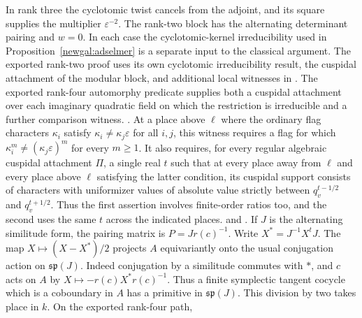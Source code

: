 In rank three the cyclotomic twist cancels from the adjoint, and its
square supplies the multiplier $\varepsilon^{-2}$. The rank-two block
has the alternating determinant pairing and $w=0$. In each case the
cyclotomic-kernel irreducibility used in Proposition~\ref{newgal:adselmer}
is a separate input to the classical argument. The exported rank-two
proof uses its own cyclotomic irreducibility result, the cuspidal
attachment of the modular block, and additional local witnesses in
.
The exported rank-four automorphy predicate supplies both a cuspidal
attachment over each imaginary quadratic field on which the restriction
is irreducible and a further comparison witness.
.
At a place above \(\ell\) where the ordinary flag characters
\(\kappa_i\) satisfy \(\kappa_i\ne\kappa_j\varepsilon\) for
all \(i,j\), this witness requires a flag for which
\(\kappa_i^m\ne(\kappa_j\varepsilon)^m\) for every \(m\ge1\).
It also requires, for every regular algebraic cuspidal attachment
\(\Pi\), a single real \(t\) such that at every place away from
\(\ell\) and every place above \(\ell\) satisfying the latter
condition, its cuspidal support consists of characters with
uniformizer values of absolute value strictly between
\(q_v^{t-1/2}\) and \(q_v^{t+1/2}\). Thus the first assertion
involves finite-order ratios too, and the second uses the same
\(t\) across the indicated places.
and .
If $J$ is the alternating similitude form, the pairing
matrix is $P=Jr(c)^{-1}$. Write $X^*=J^{-1}X^tJ$. The map
$X\mapsto (X-X^*)/2$ projects $A$ equivariantly onto the usual
conjugation action on $\mathfrak{sp}(J)$. Indeed conjugation by a
similitude commutes with $*$, and $c$ acts on $A$ by
$X\mapsto-r(c)X^*r(c)^{-1}$. Thus a finite symplectic tangent cocycle
which is a coboundary in $A$ has a primitive in $\mathfrak{sp}(J)$.
This division by two takes place in $k$. On the exported rank-four path,
